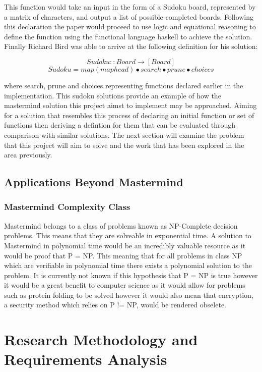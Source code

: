 \documentclass[12pt]{article}  %
\theoremstyle{definition}
\theoremstyle{remark}
\begin{document}
This function would take an input in the form of a Sudoku board, represented by a matrix of characters, and output a list of possible completed boards. Following this declaration the paper would proceed to use logic and equational reasoning to define the function using the functional language haskell to achieve the solution. Finally Richard Bird was able to arrive at the following definition for his solution:

\[ Sudoku :: Board \rightarrow [Board]\]
\[ Sudoku = map (map head) \bullet search \bullet prune \bullet choices\]

where search, prune and choices representing functions declared earlier in the implementation. This sudoku solutions provide an example of how the mastermind solution this project aimst to implement may be approached. Aiming for a solution that resembles this process of declaring an initial function or set of functions then deriving a defintion for them that can be evaluated through comparison with similar solutions. The next section will examine the problem that this project will aim to solve and the work that has been explored in the area previously.

\subsection {Applications Beyond Mastermind}

\subsubsection {Mastermind Complexity Class}
Mastermind belongs to a class of problems known as NP-Complete decision problems. This means that they are solveable in exponential time. A solution to Mastermind in polynomial time
would be an incredibly valuable resource as it would be proof that P = NP. This meaning that for all problems in class NP which are verifiable in polynomial time there exists a polynomial
solution to the problem. It is currently not known if this hypothesis that P = NP is true however it would be a great benefit to computer science as it would allow for problems such as 
protein folding to be solved however it would also mean that encryption, a security method which relies on P != NP, would be rendered obselete.

\newpage                     %
\section{Research Methodology and Requirements Analysis}\label{ss:back}
\end{document}
